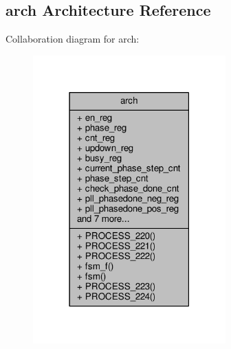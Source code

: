 \subsection{arch Architecture Reference}
\label{classpll__ps_1_1arch}


Collaboration diagram for arch\+:\nopagebreak
\begin{figure}[H]
\begin{center}
\leavevmode
\includegraphics[width=210pt]{d3/dfa/classpll__ps_1_1arch__coll__graph}
\end{center}
\end{figure}
